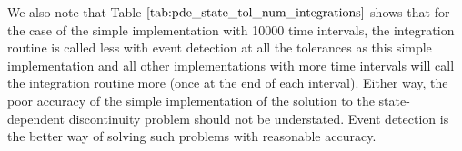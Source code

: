 \documentclass{article}
\begin{document}
We also note that Table $\ref{tab:pde_state_tol_num_integrations}$ shows that for the case of the simple implementation with 10000 time intervals, the integration routine is called less with event detection at all the tolerances as this simple implementation and all other implementations with more time intervals will call the integration routine more (once at the end of each interval). Either way, the poor accuracy of the simple implementation of the solution to the state-dependent discontinuity problem should not be understated. Event detection is the better way of solving such problems with reasonable accuracy. 
\end{document}
